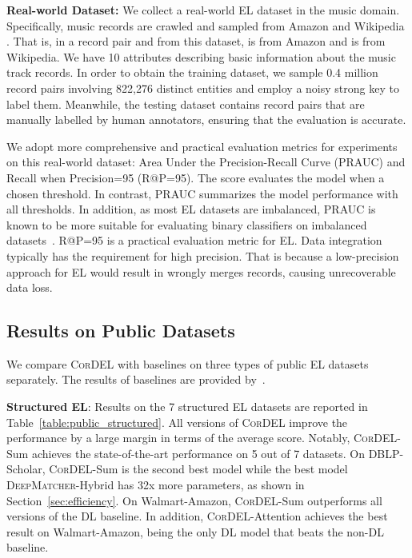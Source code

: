 \documentclass[conference]{IEEEtran}
\begin{document}
\textbf{Real-world Dataset:} We collect a real-world EL dataset in the music domain. Specifically, music records are crawled and sampled from Amazon and Wikipedia \cite{zhucollective}. That is, in a record pair  and  from this dataset,  is from Amazon and  is from Wikipedia. We have 10 attributes describing basic information about the music track records.
In order to obtain the training dataset, we sample 0.4 million record pairs involving 822,276 distinct entities and employ a noisy strong key to label them. Meanwhile, the testing dataset contains record pairs that are manually labelled by human annotators, ensuring that the evaluation is accurate.

We adopt more comprehensive and practical evaluation metrics for experiments on this real-world dataset: Area Under the Precision-Recall Curve (PRAUC) and Recall when Precision=95 (R@P=95). The  score evaluates the model when a chosen threshold. In contrast, PRAUC summarizes the model performance with all thresholds. In addition, as most EL datasets are imbalanced, PRAUC is known to be more suitable for evaluating binary classifiers on imbalanced datasets~\cite{saito2015precision}. R@P=95 is a practical evaluation metric for EL. Data integration typically has the requirement for high precision. That is because a low-precision approach for EL would result in wrongly merges records, causing unrecoverable data loss.


\subsection{Results on Public Datasets}

We compare \textsc{CorDEL} with baselines on three types of public EL datasets separately. The results of baselines are provided by~\cite{mudgal2018deep}.

\textbf{Structured EL}: Results on the 7 structured EL datasets are reported in Table~\ref{table:public_structured}. All versions of \textsc{CorDEL} improve the performance by a large margin in terms of the average  score. Notably, \textsc{CorDEL}-Sum achieves the state-of-the-art performance on 5 out of 7 datasets. On DBLP-Scholar, \textsc{CorDEL}-Sum is the second best model while the best model \textsc{DeepMatcher}-Hybrid has 32x more parameters, as shown in Section~\ref{sec:efficiency}. On Walmart-Amazon, \textsc{CorDEL}-Sum outperforms all versions of the DL baseline. In addition, \textsc{CorDEL}-Attention achieves the best result on Walmart-Amazon, being the only DL model that beats the non-DL baseline.
    
\end{document}

